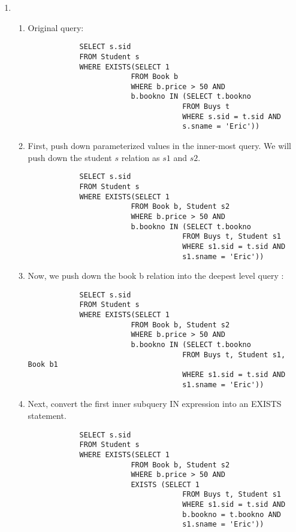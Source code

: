 \documentclass{article}
\begin{document}
\begin{enumerate}
\begin{enumerate}
\begin{enumerate}
        \end{enumerate}
        \newpage
        \item %
        \begin{enumerate}
            \item Original query:
            \begin{lstlisting}
            SELECT s.sid
            FROM Student s
            WHERE EXISTS(SELECT 1
                        FROM Book b
                        WHERE b.price > 50 AND
                        b.bookno IN (SELECT t.bookno
                                    FROM Buys t
                                    WHERE s.sid = t.sid AND
                                    s.sname = 'Eric'))

            \end{lstlisting}

            \item First, push down parameterized values in the inner-most query. We will push down the student $s$ relation as $s1$ and $s2$.
            \begin{lstlisting}
            SELECT s.sid
            FROM Student s
            WHERE EXISTS(SELECT 1
                        FROM Book b, Student s2
                        WHERE b.price > 50 AND
                        b.bookno IN (SELECT t.bookno
                                    FROM Buys t, Student s1
                                    WHERE s1.sid = t.sid AND
                                    s1.sname = 'Eric'))

            \end{lstlisting}

            \item Now, we push down the book b relation into the deepest level query :
            \begin{lstlisting}
            SELECT s.sid
            FROM Student s
            WHERE EXISTS(SELECT 1
                        FROM Book b, Student s2
                        WHERE b.price > 50 AND
                        b.bookno IN (SELECT t.bookno
                                    FROM Buys t, Student s1, Book b1
                                    WHERE s1.sid = t.sid AND
                                    s1.sname = 'Eric'))
            \end{lstlisting}

            \item Next, convert the first inner subquery IN expression into an EXISTS statement.
            \begin{lstlisting}
            SELECT s.sid
            FROM Student s
            WHERE EXISTS(SELECT 1
                        FROM Book b, Student s2
                        WHERE b.price > 50 AND
                        EXISTS (SELECT 1
                                    FROM Buys t, Student s1
                                    WHERE s1.sid = t.sid AND
                                    b.bookno = t.bookno AND
                                    s1.sname = 'Eric'))


\end{lstlisting}
\end{enumerate}
\end{enumerate}
\end{enumerate}
\end{document}
